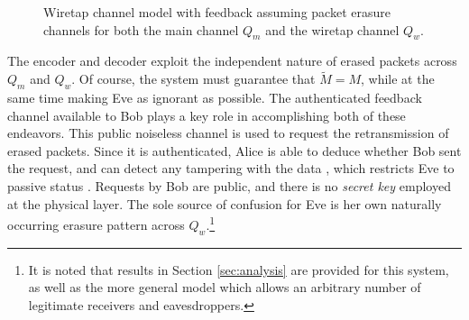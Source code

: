 \documentclass[10pt,twocolumn,twoside]{IEEEtran} \newlength{\pic}
\theoremstyle{definition}
\theoremstyle{remark}
\theoremstyle{plain}
\begin{document}
\begin{figure}
\begin{center}
\end{center}
\caption{Wiretap channel model with feedback assuming packet erasure channels for both the main channel $Q_m$ and the wiretap channel $Q_w$.}\label{fig:wiretapChannel}
\end{figure}

The encoder and decoder exploit the independent nature of erased packets across $Q_m$ and $Q_w$. Of course, the system must guarantee that $\tilde{M} = M$, while at the same time making Eve as ignorant as possible. The authenticated feedback channel available to Bob plays a key role in accomplishing both of these endeavors. This public noiseless channel is used to request the retransmission of erased packets. Since it is authenticated, Alice is able to deduce whether Bob sent the request, and can detect any tampering with the data \cite{Stinson_CryptoBook}, which restricts Eve to passive status \cite{MaurerPart1}. Requests by Bob are public, and there is no \emph{secret key} employed at the physical layer. The sole source of confusion for Eve is her own naturally occurring erasure pattern across $Q_w$.\footnote{It is noted that results in Section \ref{sec:analysis} are provided for this system, as well as the more general model which allows an arbitrary number of legitimate receivers and eavesdroppers.}
\end{document}
